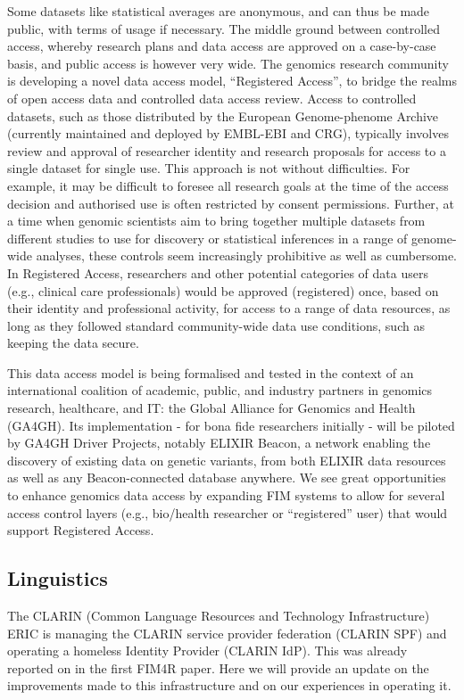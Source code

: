 \documentclass[fleqn,11pt]{wlscirep}
\begin{document}
{Some datasets like statistical averages are anonymous, and can thus be made public, with terms of usage if necessary. The middle ground between controlled access, whereby research plans and data access are approved on a case-by-case basis, and public access is however very wide. The genomics research community is developing a novel data access model, “Registered Access”, to bridge the realms of open access data and controlled data access review\cite{dyke}. Access to controlled datasets, such as those distributed by the European Genome-phenome Archive (currently maintained and deployed by EMBL-EBI and CRG), typically involves review and approval of researcher identity and research proposals for access to a single dataset for single use. This approach is not without difficulties. For example, it may be difficult to foresee all research goals at the time of the access decision and authorised use is often restricted by consent permissions. Further, at a time when genomic scientists aim to bring together multiple datasets from different studies to use for discovery or statistical inferences in a range of genome-wide analyses, these controls seem increasingly prohibitive as well as cumbersome. In Registered Access, researchers and other potential categories of data users (e.g., clinical care professionals) would be approved (registered) once, based on their identity and professional activity, for access to a range of data resources, as long as they followed standard community-wide data use conditions, such as keeping the data secure.

This data access model is being formalised and tested in the context of an international coalition of academic, public, and industry partners in genomics research, healthcare, and IT: the Global Alliance for Genomics and Health (GA4GH)\cite{ga4gh}. Its implementation - for bona fide researchers initially - will be piloted by GA4GH Driver Projects, notably ELIXIR Beacon, a network enabling the discovery of existing data on genetic variants, from both ELIXIR data resources as well as any Beacon-connected database anywhere. We see great opportunities to enhance genomics data access by expanding FIM systems to allow for several access control layers (e.g., bio/health researcher or “registered” user) that would support Registered Access.

\subsection{Linguistics}
The CLARIN (Common Language Resources and Technology Infrastructure) ERIC is managing the CLARIN service provider federation (CLARIN SPF) and operating a homeless Identity Provider (CLARIN IdP). This was already reported on in the first FIM4R paper. Here we will provide an update on the improvements made to this infrastructure and on our experiences in operating it.

}
\end{document}
